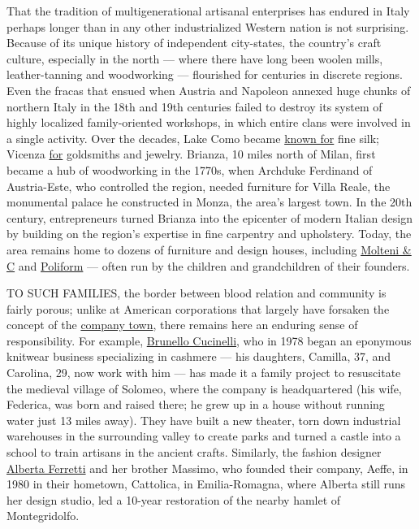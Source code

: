 That the tradition of multigenerational artisanal enterprises has
endured in Italy perhaps longer than in any other industrialized Western
nation is not surprising. Because of its unique history of independent
city-states, the country's craft culture, especially in the north ---
where there have long been woolen mills, leather-tanning and woodworking
--- flourished for centuries in discrete regions. Even the fracas that
ensued when Austria and Napoleon annexed huge chunks of northern Italy
in the 18th and 19th centuries failed to destroy its system of highly
localized family-oriented workshops, in which entire clans were involved
in a single activity. Over the decades, Lake Como became
\href{https://www.nytimes.com/1991/11/10/travel/shopper-s-world-silk-on-lake-como-s-shores.html}{known
for} fine silk; Vicenza
\href{https://www.nytimes.com/2018/09/22/style/jewelry-vicenza-italy-roberto-coin.html}{for}
goldsmiths and jewelry. Brianza, 10 miles north of Milan, first became a
hub of woodworking in the 1770s, when Archduke Ferdinand of
Austria-Este, who controlled the region, needed furniture for Villa
Reale, the monumental palace he constructed in Monza, the area's largest
town. In the 20th century, entrepreneurs turned Brianza into the
epicenter of modern Italian design by building on the region's expertise
in fine carpentry and upholstery. Today, the area remains home to dozens
of furniture and design houses, including
\href{https://www.molteni.it/us/}{Molteni \& C} and
\href{https://www.poliform.it/en-us/poliform}{Poliform} --- often run by
the children and grandchildren of their founders.

TO SUCH FAMILIES, the border between blood relation and community is
fairly porous; unlike at American corporations that largely have
forsaken the concept of the
\href{https://www.nytimes.com/2019/08/28/t-magazine/olivetti-typewriters-ivrea-italy.html}{company
town}, there remains here an enduring sense of responsibility. For
example, \href{https://www.brunellocucinelli.com/en/}{Brunello
Cucinelli}, who in 1978 began an eponymous knitwear business
specializing in cashmere --- his daughters, Camilla, 37, and Carolina,
29, now work with him --- has made it a family project to resuscitate
the medieval village of Solomeo, where the company is headquartered (his
wife, Federica, was born and raised there; he grew up in a house without
running water just 13 miles away). They have built a new theater, torn
down industrial warehouses in the surrounding valley to create parks and
turned a castle into a school to train artisans in the ancient crafts.
Similarly, the fashion designer
\href{https://www.albertaferretti.com/us_en/}{Alberta Ferretti} and her
brother Massimo, who founded their company, Aeffe, in 1980 in their
hometown, Cattolica, in Emilia-Romagna, where Alberta still runs her
design studio, led a 10-year restoration of the nearby hamlet of
Montegridolfo.

